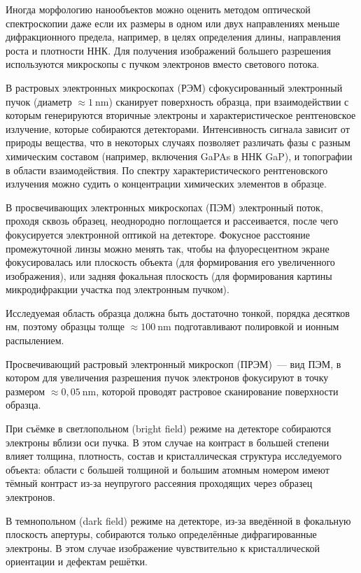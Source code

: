 Иногда морфологию нанообъектов можно оценить методом оптической спектроскопии
даже если их размеры в одном или двух направлениях меньше дифракционного
предела, например, в целях определения длины, направления роста и плотности
ННК. Для получения изображений большего разрешения используются микроскопы с
пучком электронов вместо светового потока.

В растровых электронных микроскопах (РЭМ) сфокусированный электронный пучок
(диаметр \(\approx 1~\si{\nano\meter}\)) сканирует поверхность образца, при
взаимодействии с которым генерируются вторичные электроны и характеристическое
рентгеновское излучение, которые собираются детекторами. Интенсивность сигнала
зависит от природы вещества, что в некоторых случаях позволяет различать фазы с
разным химическим составом (например, включения GaPAs в ННК GaP), и топографии
в области взаимодействия. По спектру характеристического рентгеновского
излучения можно судить о концентрации химических элементов в образце.

В просвечивающих электронных микроскопах (ПЭМ) электронный поток, проходя
сквозь образец, неоднородно поглощается и рассеивается, после чего фокусируется
электронной оптикой на детекторе. Фокусное расстояние промежуточной линзы можно
менять так, чтобы на флуоресцентном экране фокусировалась или плоскость объекта
(для формирования его увеличенного изображения), или задняя фокальная плоскость
(для формирования картины микродифракции участка под электронным пучком).

Исследуемая область образца должна быть достаточно тонкой, порядка десятков нм,
поэтому образцы толще \(\approx 100~\si{\nano\meter}\) подготавливают
полировкой и ионным распылением.

Просвечивающий растровый электронный микроскоп (ПРЭМ)~--- вид ПЭМ, в котором
для увеличения разрешения пучок электронов фокусируют в точку размером
\(\approx 0,05~\si{\nano\meter}\), которой проводят растровое сканирование
поверхности образца.

При съёмке в светлопольном (bright field) режиме на детекторе собираются
электроны вблизи оси пучка. В этом случае на контраст в большей степени влияет
толщина, плотность, состав и кристаллическая структура исследуемого объекта:
области с большей толщиной и большим атомным номером имеют тёмный контраст
из-за неупругого рассеяния проходящих через образец электронов.

В темнопольном (dark field) режиме на детекторе, из-за введённой в фокальную
плоскость апертуры, собираются только определённые дифрагированные электроны. В
этом случае изображение чувствительно к кристаллической ориентации и дефектам
решётки.

